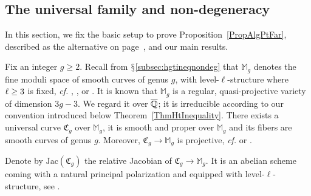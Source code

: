 \subsection{The universal family and non-degeneracy}
\label{subsec:univfamily}
In this section, we fix the basic setup to prove 
Proposition~\ref{PropAlgPtFar}, described as the alternative on page~\pageref{eq:alternative}, and
our main results.

Fix an integer $g \ge 2$.
Recall from $\mathsection$\ref{subsec:hgtineqnondeg} that
$\mathbb{M}_g$ 
denotes the fine moduli space of smooth curves of genus $g$,
with level-$\ell$-structure where $\ell\ge 3$ is fixed, \textit{cf.}
 \cite[Chapter~XVI, Theorem~2.11 (or above
Proposition~2.8)]{ACG:Curve},
 \cite[(5.14)]{DM:irreducibility}, or \cite[Theorem
 1.8]{OortSteenbrink}. It is known that 
$\mathbb{M}_g$ is a regular, quasi-projective variety of dimension
$3g-3$. We regard it over ${\overline{\mathbb{Q}}}$; it is irreducible according
to our convention introduced below Theorem~\ref{ThmHtInequality}. 
There exists a universal curve $\mathfrak{C}_g$ over
$\mathbb{M}_g$,  it is smooth and proper over
$\mathbb{M}_g$ and its fibers are smooth curves of genus
$g$. Moreover, $\mathfrak{C}_g\rightarrow \mathbb{M}_g$ is
projective, \textit{cf.} \cite[Corollary to Theorem
1.2]{DM:irreducibility} or  \cite[Remark 2, \S 9.3]{NeronModels}.

Denote by $\mathrm{Jac}(\mathfrak{C}_g)$ the relative Jacobian of
$\mathfrak{C}_g \rightarrow \mathbb{M}_g$. It is an abelian scheme
coming with a natural principal polarization and equipped with level-$\ell$-structure, see
\cite[Proposition 6.9]{MFK:GIT94}.



